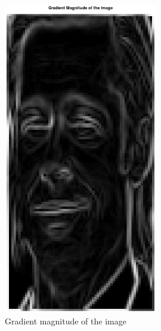 \documentclass[a4paper]{article}
\begin{document}
\begin{minipage}{0.49\textwidth}
\begin{figure}[H]
    \centering
    \includegraphics[width=0.6\textwidth]{./images/2_2_gradient_magnitude.png}
    \caption{Gradient magnitude of the image}
\end{figure}
\end{minipage}
\end{document}
